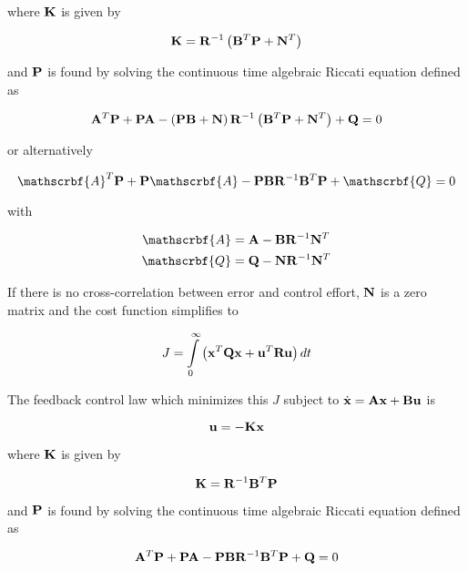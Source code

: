 where $\mathbf{K}$ is given by

\begin{equation*}
  \mathbf{K} = \mathbf{R}^{-1} \left(\mathbf{B}^T\mathbf{P} + \mathbf{N}^T\right)
\end{equation*}

and $\mathbf{P}$ is found by solving the continuous time algebraic Riccati equation
defined as

\begin{equation*}
  \mathbf{A}^T\mathbf{P} + \mathbf{P}\mathbf{A} - \left(\mathbf{P}\mathbf{B} +
    \mathbf{N}\right) \mathbf{R}^{-1} \left(\mathbf{B}^T\mathbf{P} + \mathbf{N}^T\right) +
    \mathbf{Q} = 0
\end{equation*}

or alternatively

\begin{equation*}
  \mathscrbf{A}^T\mtx{P} + \mtx{P}\mathscrbf{A} -
    \mtx{P}\mtx{B}\mtx{R}^{-1}\mtx{B}^T\mtx{P} + \mathscrbf{Q} = 0
\end{equation*}

with

\begin{align*}
  \mathscrbf{A} &= \mtx{A} - \mtx{B}\mtx{R}^{-1}\mtx{N}^T \\
  \mathscrbf{Q} &= \mtx{Q} - \mtx{N}\mtx{R}^{-1}\mtx{N}^T
\end{align*}

If there is no cross-correlation between \gls{error} and \gls{control effort},
$\mathbf{N}$ is a zero matrix and the cost function simplifies to

\begin{equation*}
  J = \int\limits_0^\infty
    \left(\mathbf{x}^T\mathbf{Q}\mathbf{x} + \mathbf{u}^T\mathbf{R}\mathbf{u}\right) dt
\end{equation*}

The feedback \gls{control law} which minimizes this $J$ subject to
$\dot{\mathbf{x}} = \mathbf{A}\mathbf{x} + \mathbf{B}\mathbf{u}$ is

\begin{equation*}
  \mathbf{u} = -\mathbf{K}\mathbf{x}
\end{equation*}

where $\mathbf{K}$ is given by

\begin{equation*}
  \mathbf{K} = \mathbf{R}^{-1}\mathbf{B}^T\mathbf{P}
\end{equation*}

and $\mathbf{P}$ is found by solving the continuous time algebraic Riccati equation
defined as

\begin{equation*}
  \mathbf{A}^T\mathbf{P} + \mathbf{P}\mathbf{A} -
    \mathbf{P}\mathbf{B}\mathbf{R}^{-1}\mathbf{B}^T\mathbf{P} + \mathbf{Q} = 0
\end{equation*}

